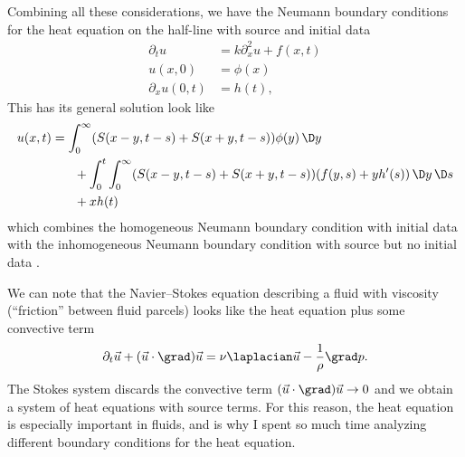 \begin{node}
\begin{node}\label{pde:heat-000N}%
Combining all these considerations, we have the Neumann boundary
conditions for the heat equation on the half-line with source and
initial data
\begin{subequations}
\begin{align}
\partial_{t}u &= k\partial_{x}^{2}u + f(x,t)\\
u(x,0) &= \phi(x)\\
\partial_{x}u(0,t) &= h(t),
\end{align}
\end{subequations}
This has its general solution look like
\begin{equation}
\begin{split}
u(x,t) &= \int^{\infty}_{0}(S(x-y,t-s)+S(x+y,t-s))\phi(y)\,\D y\\
&\phantom{=}\quad+\int^{t}_{0}\int^{\infty}_{0}(S(x-y,t-s)+S(x+y,t-s))(f(y,s)+yh'(s))\,\D y\,\D s\\
&\phantom{=}\quad+xh(t)
\end{split}
\end{equation}
which combines the homogeneous Neumann boundary condition with initial data 
with the inhomogeneous Neumann boundary condition with source but no
initial data .
\end{node} %

\end{node} %


\begin{node}\label{pde:heat-000O}%
We can note that the Navier--Stokes equation describing a fluid with
viscosity (``friction'' between fluid parcels) looks like the heat
equation plus some convective term
\begin{equation*}
\partial_{t}\vec{u}+(\vec{u}\cdot\grad)\vec{u}=\nu\laplacian\vec{u}-\frac{1}{\rho}\grad p.
\end{equation*}
The Stokes system discards the convective term $(\vec{u}\cdot\grad)\vec{u}\to0$
and we obtain a system of heat equations with source terms. For this
reason, the heat equation is especially important in fluids, and is why
I spent so much time analyzing different boundary conditions for the
heat equation.
\end{node} %

